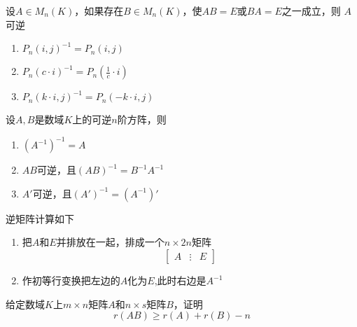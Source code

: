 \documentclass[11pt]{article}
\begin{document}
\begin{corollary}[]
设\(A\in M_n(K)\)，如果存在\(B\in M_n(K)\)，使\(AB=E\)或\(BA=E\)之一成立，则
\(A\)可逆
\end{corollary}

\begin{proposition}[]
\begin{enumerate}
\item \(P_n(i,j)^{-1}=P_n(i,j)\)
\item \(P_n(c\cdot i)^{-1}=P_n(\frac{1}{c}\cdot i)\)
\item \(P_n(k\cdot i,j)^{-1}=P_n(-k\cdot i,j)\)
\end{enumerate}
\end{proposition}

\begin{proposition}[]
设\(A,B\)是数域\(K\)上的可逆\(n\)阶方阵，则
\begin{enumerate}
\item \((A^{-1})^{-1}=A\)
\item \(AB\)可逆，且\((AB)^{-1}=B^{-1}A^{-1}\)
\item \(A'\)可逆，且\((A')^{-1}=(A^{-1})'\)
\end{enumerate}
\end{proposition}

逆矩阵计算如下
\begin{enumerate}
\item 把\(A\)和\(E\)并排放在一起，排成一个\(n\times 2n\)矩阵
\begin{equation*}
\begin{bmatrix}
A&\vdots&E
 \end{bmatrix}
\end{equation*}
\item 作初等行变换把左边的\(A\)化为\(E\),此时右边是\(A^{-1}\)
\end{enumerate}


\begin{proposition}[]
给定数域\(K\)上\(m\times n\)矩阵\(A\)和\(n\times s\)矩阵\(B\)，证明
\begin{equation*}
r(AB)\ge r(A)+r(B)-n
\end{equation*}
\end{proposition}
\end{document}
